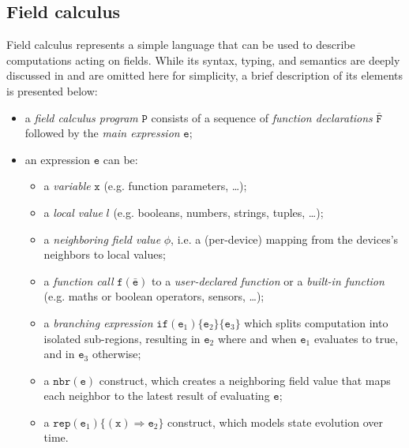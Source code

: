 \subsection{Field calculus}
\label{sec:field-calculus}

Field calculus represents a simple language that can be used to describe computations acting on fields.
%
While its syntax, typing, and semantics are deeply discussed in \cite{VIROLI2019100486} and are omitted here for simplicity, a brief description of its elements is presented below:
%
\begin{itemize}
    \item a \textit{field calculus program} $\texttt{P}$ consists of a sequence of \textit{function declarations} $\bar{\texttt{F}}$ followed by the \textit{main expression} $\texttt{e}$;
    \item an expression $\texttt{e}$ can be:
    \begin{itemize}
        \item a \textit{variable} $\texttt{x}$ (e.g. function parameters, \dots);
        \item a \textit{local value} $l$ (e.g. booleans, numbers, strings, tuples, \dots);
        \item a \textit{neighboring field value} $\phi$, i.e. a (per-device) mapping from the devices's neighbors to local values;
        \item a \textit{function call} $\texttt{f}(\bar{\texttt{e}})$ to a \textit{user-declared function} or a \textit{built-in function} (e.g. maths or boolean operators, sensors, \dots);
        \item a \textit{branching expression} $\texttt{if} (\texttt{e}_1)\{\texttt{e}_2\}\{\texttt{e}_3\}$ which splits computation into isolated sub-regions, resulting in $\texttt{e}_2$ where and when $\texttt{e}_1$ evaluates to true, and in $\texttt{e}_3$ otherwise;
        \item a $\texttt{nbr}(\texttt{e})$ construct, which creates a neighboring field value that maps each neighbor to the latest result of evaluating $\texttt{e}$;
        \item a $\texttt{rep}(\texttt{e}_1)\{(\texttt{x})\Rightarrow \texttt{e}_2\}$ construct, which models state evolution over time.
    \end{itemize}
\end{itemize}


